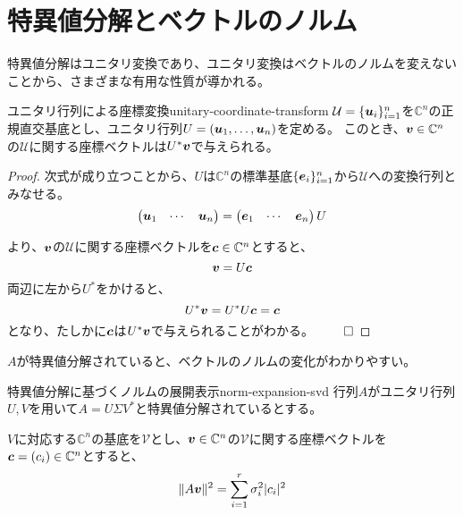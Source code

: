 \documentclass[../../../topic_linear-algebra]{subfiles}
\begin{document}
\sectionline
\section{特異値分解とベクトルのノルム}

特異値分解はユニタリ変換であり、ユニタリ変換はベクトルのノルムを変えないことから、さまざまな有用な性質が導かれる。

\begin{theorem}{ユニタリ行列による座標変換}{unitary-coordinate-transform}
  $\mathcal{U} = \{ \vb*{u}_i \}_{i=1}^n$を$\mathbb{C}^n$の正規直交基底とし、ユニタリ行列$U = (\vb*{u}_1, \ldots, \vb*{u}_n)$を定める。
  このとき、$\vb*{v} \in \mathbb{C}^n$の$\mathcal{U}$に関する座標ベクトルは$U^*\vb*{v}$で与えられる。
\end{theorem}

\begin{proof}
  次式が成り立つことから、$U$は$\mathbb{C}^n$の標準基底$\{ \vb*{e}_i \}_{i=1}^n$から$\mathcal{U}$への変換行列とみなせる。
  \begin{equation*}
    \begin{pmatrix}
      \vb*{u}_1 & \cdots & \vb*{u}_n
    \end{pmatrix} = \begin{pmatrix}
      \vb*{e}_1 & \cdots & \vb*{e}_n
    \end{pmatrix} U
  \end{equation*}

  より、$\vb*{v}$の$\mathcal{U}$に関する座標ベクトルを$\vb*{c} \in \mathbb{C}^n$とすると、
  \begin{equation*}
    \vb*{v} = U \vb*{c}
  \end{equation*}
  両辺に左から$U^*$をかけると、
  \begin{equation*}
    U^* \vb*{v} = U^* U \vb*{c} = \vb*{c}
  \end{equation*}
  となり、たしかに$\vb*{c}$は$U^* \vb*{v}$で与えられることがわかる。 $\qed$
\end{proof}

\br

$A$が特異値分解されていると、ベクトルのノルムの変化がわかりやすい。

\begin{theorem}{特異値分解に基づくノルムの展開表示}{norm-expansion-svd}
  行列$A$がユニタリ行列$U,V$を用いて$A = U \Sigma V^*$と特異値分解されているとする。
  
  $V$に対応する$\mathbb{C}^n$の基底を$\mathcal{V}$とし、$\vb*{v} \in \mathbb{C}^n$の$\mathcal{V}$に関する座標ベクトルを$\vb*{c} = (c_i) \in \mathbb{C}^n$とすると、
  \begin{equation*}
    \| A \vb*{v} \|^2 = \sum_{i=1}^r \sigma_i^2 |c_i|^2
  \end{equation*}
\end{theorem}
\end{document}
